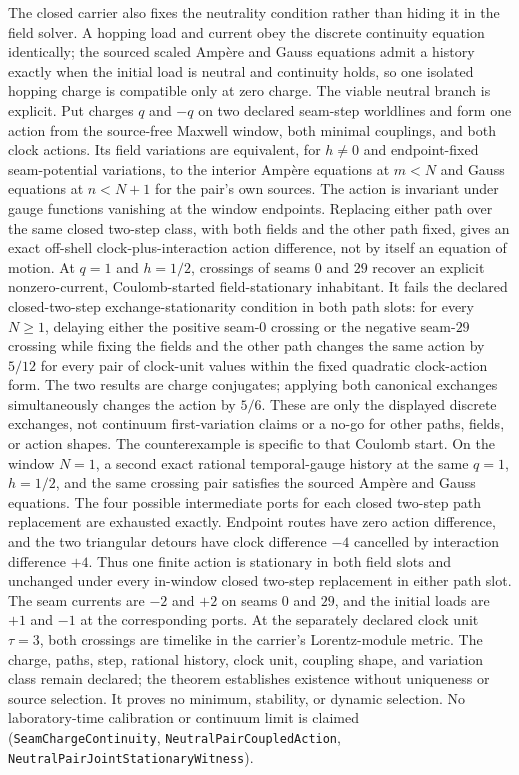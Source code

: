 \documentclass[11pt]{article}
\begin{document}
The closed carrier also fixes the neutrality condition rather than hiding it
in the field solver.  A hopping load and current obey the discrete continuity
equation identically; the sourced scaled Amp\`ere and Gauss equations admit a
history exactly when the initial load is neutral and continuity holds, so one
isolated hopping charge is compatible only at zero charge.  The viable
neutral branch is explicit.  Put charges $q$ and $-q$ on two declared
seam-step worldlines and form one action from the source-free Maxwell window,
both minimal couplings, and both clock actions.  Its field variations are
equivalent, for $h\ne0$ and endpoint-fixed seam-potential variations, to the
interior Amp\`ere equations at $m<N$ and Gauss equations at $n<N+1$ for the
pair's own sources.  The action is invariant under gauge functions vanishing
at the window endpoints.  Replacing either path over the same closed two-step
class, with both fields and the other path fixed, gives an exact off-shell
clock-plus-interaction action difference, not by itself an equation of motion.
At $q=1$ and $h=1/2$, crossings of seams $0$ and $29$ recover an explicit
nonzero-current, Coulomb-started field-stationary inhabitant.  It fails the
declared closed-two-step exchange-stationarity condition in both path slots:
for every $N\ge1$, delaying either the positive seam-$0$ crossing or the
negative seam-$29$ crossing while fixing the fields and the other path changes
the same action by $5/12$ for every pair of clock-unit values within the fixed
quadratic clock-action form.  The two results are charge conjugates; applying
both canonical exchanges simultaneously changes the action by $5/6$.  These
are only the displayed discrete exchanges, not continuum first-variation
claims or a no-go for other paths, fields, or action shapes.
The counterexample is specific to that Coulomb start.  On the window $N=1$,
a second exact rational temporal-gauge history at the same $q=1$, $h=1/2$,
and the same crossing pair satisfies the sourced Amp\`ere and Gauss equations.
The four possible intermediate ports for each closed two-step path replacement
are exhausted exactly.  Endpoint routes have zero action difference, and the
two triangular detours have clock difference $-4$ cancelled by interaction
difference $+4$.  Thus one finite action is stationary in both field slots and
unchanged under every in-window closed two-step replacement in either path
slot.  The seam currents are $-2$ and $+2$ on seams $0$ and $29$, and the
initial loads are $+1$ and $-1$ at the corresponding ports.  At the separately
declared clock unit $\tau=3$, both crossings are timelike in the carrier's
Lorentz-module metric.  The charge, paths, step, rational history, clock unit,
coupling shape, and variation class remain declared; the theorem establishes
existence without uniqueness or source selection. It proves no minimum,
stability, or dynamic selection. No laboratory-time
calibration or continuum limit is claimed
(\texttt{SeamChargeContinuity},
\texttt{NeutralPairCoupledAction},
\texttt{NeutralPairJointStationaryWitness}).
\end{document}
